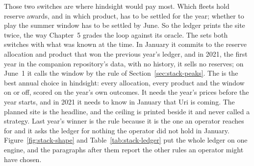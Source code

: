 Those two switches are where hindsight would pay most. Which fleets hold reserve awards, and in which product, has to be settled for the year; whether to play the summer window has to be settled by June. So the ledger prints the site twice, the way Chapter~5 grades the loop against its oracle. The  sets both switches with what was known at the time. In January it commits to the reserve allocation and product that won the previous year's ledger, and in 2021, the first year in the companion repository's data, with no history, it sells no reserves; on June~1 it calls the window by the rule of Section~\ref{sec:stack-peaks}. The  is the best annual choice in hindsight: every allocation, every product and the window on or off, scored on the year's own outcomes. It needs the year's prices before the year starts, and in 2021 it needs to know in January that Uri is coming. The planned site is the headline, and the ceiling is printed beside it and never called a strategy. %
Last year's winner is the rule because it is the one an operator reaches for and it asks the ledger for nothing the operator did not hold in January. Figure~\ref{fig:stack-shape} and Table~\ref{tab:stack-ledger} put the whole ledger on one engine, and the paragraphs after them report the other rules an operator might have chosen.

